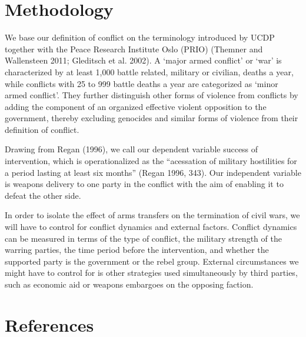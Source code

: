 \documentclass[]{article}
\begin{document}
\section{Methodology}\label{methodology}

We base our definition of conflict on the terminology introduced by UCDP
together with the Peace Research Institute Oslo (PRIO) (Themner and
Wallensteen 2011; Gleditsch et al. 2002). A `major armed conflict' or
`war' is characterized by at least 1,000 battle related, military or
civilian, deaths a year, while conflicts with 25 to 999 battle deaths a
year are categorized as `minor armed conflict'. They further distinguish
other forms of violence from conflicts by adding the component of an
organized effective violent opposition to the government, thereby
excluding genocides and similar forms of violence from their definition
of conflict.

Drawing from Regan (1996), we call our dependent variable success of
intervention, which is operationalized as the ``acessation of military
hostilities for a period lasting at least six months'' (Regan 1996,
343). Our independent variable is weapons delivery to one party in the
conflict with the aim of enabling it to defeat the other side.

In order to isolate the effect of arms transfers on the termination of
civil wars, we will have to control for conflict dynamics and external
factors. Conflict dynamics can be measured in terms of the type of
conflict, the military strength of the warring parties, the time period
before the intervention, and whether the supported party is the
government or the rebel group. External circumstances we might have to
control for is other strategies used simultaneously by third parties,
such as economic aid or weapons embargoes on the opposing faction.

\section*{References}\label{references}
\end{document}
